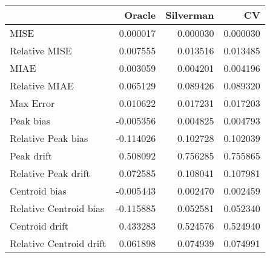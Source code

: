 \begin{tabular}{lrrr}
  \hline
 & Oracle & Silverman & CV \\ 
  \hline
MISE & 0.000017 & 0.000030 & 0.000030 \\ 
  Relative MISE & 0.007555 & 0.013516 & 0.013485 \\ 
  MIAE & 0.003059 & 0.004201 & 0.004196 \\ 
  Relative MIAE & 0.065129 & 0.089426 & 0.089320 \\ 
  Max Error & 0.010622 & 0.017231 & 0.017203 \\ 
  Peak bias & -0.005356 & 0.004825 & 0.004793 \\ 
  Relative Peak bias & -0.114026 & 0.102728 & 0.102039 \\ 
  Peak drift & 0.508092 & 0.756285 & 0.755865 \\ 
  Relative Peak drift & 0.072585 & 0.108041 & 0.107981 \\ 
  Centroid bias & -0.005443 & 0.002470 & 0.002459 \\ 
  Relative Centroid bias & -0.115885 & 0.052581 & 0.052340 \\ 
  Centroid drift & 0.433283 & 0.524576 & 0.524940 \\ 
  Relative Centroid drift & 0.061898 & 0.074939 & 0.074991 \\ 
   \hline
\end{tabular}
